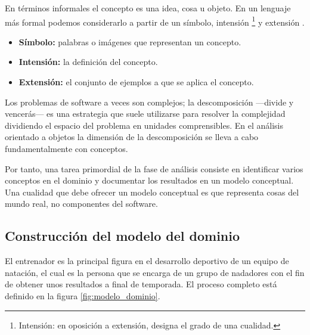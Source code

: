 	En términos informales el concepto es una idea, cosa u objeto. En un lenguaje más formal podemos considerarlo a partir de un símbolo, intensión \footnote{Intensión: en oposición a extensión, designa el grado de una cualidad.} y extensión \cite{MO95}.
	
	\begin{itemize}
		\item{{\bf Símbolo:} palabras o imágenes que representan un concepto.}
		\item{{\bf Intensión:} la definición del concepto.}
		\item{{\bf Extensión:} el conjunto de ejemplos a que se aplica el concepto.}
	\end{itemize}
	
	Los problemas de software a veces son complejos; la descomposición ---divide y vencerás--- es una estrategia que suele utilizarse para resolver la complejidad dividiendo el espacio del problema en unidades comprensibles. En el análisis orientado a objetos la dimensión de la descomposición se lleva a cabo fundamentalmente con conceptos.
		
	Por tanto, una tarea primordial de la fase de análisis consiste en identificar varios conceptos en el dominio y documentar los resultados en un modelo conceptual. Una cualidad que debe ofrecer un modelo conceptual es que representa cosas del mundo real, no componentes del software.
	

%
%
\subsection{Construcción del modelo del dominio} %
	\label{sub:construccion_del_modelo_del_dominio}

	El entrenador es la principal figura en el desarrollo deportivo de un equipo de natación, el cual es la persona que se encarga de un grupo de nadadores con el fin de obtener unos resultados a final de temporada. El proceso completo está definido en la figura \ref{fig:modelo_dominio}.
	
